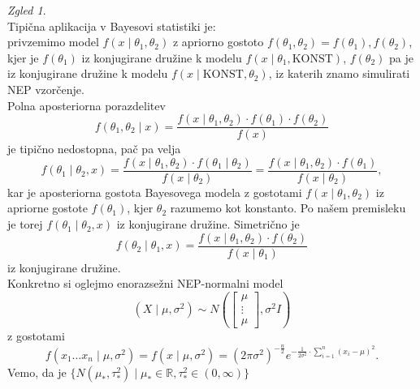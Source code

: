 \documentclass[a4paper, 12pt]{book}
\theoremstyle{definition}
\theoremstyle{remark}
\newtheorem*{exmp}{Zgled}
\newcommand{\R}{\mathbb{R}}
\begin{document}
\begin{exmp} \text{} \\
  Tipična aplikacija v Bayesovi statistiki je: \\
  privzemimo model $f(x \mid \theta_1, \theta_2)$ z apriorno gostoto $f(\theta_1, \theta_2) = f(\theta_1), f(\theta_2)$,
  kjer je $f(\theta_1)$ iz konjugirane družine k modelu $f(x \mid \theta_1, \text{KONST})$,
  $f(\theta_2)$ pa je iz konjugirane družine k modelu $f(x \mid \text{KONST}, \theta_2)$,
  iz katerih znamo simulirati NEP vzorčenje. \\
  Polna aposteriorna porazdelitev
  \begin{equation*}
    f(\theta_1, \theta_2 \mid x) = \frac{f(x \mid \theta_1, \theta_2) \cdot f(\theta_1) \cdot f(\theta_2)}{f(x)}
  \end{equation*}
  je tipično nedostopna, pač pa velja
  \begin{equation}
    \label{apost-theta1,2}
    f(\theta_1 \mid \theta_2, x) = \frac{f(x \mid \theta_1, \theta_2) \cdot f(\theta_1 \mid \theta_2)}{f(x \mid \theta_2)}
    = \frac{f(x \mid \theta_1, \theta_2) \cdot f(\theta_1)}{f(x \mid \theta_2)},
  \end{equation}
  kar je aposteriorna gostota Bayesovega modela z gostotami $f(x \mid \theta_1, \theta_2)$ iz apriorne gostote $f(\theta_1)$,
  kjer $\theta_2$ razumemo kot konstanto.
  Po našem premisleku je torej $f(\theta_1 \mid \theta_2, x)$ iz  konjugirane družine.
  Simetrično je
  \begin{equation*}
    f(\theta_2 \mid \theta_1, x) = \frac{f(x \mid \theta_1, \theta_2) \cdot f(\theta_2)}{f(x \mid \theta_1)}
  \end{equation*}
  iz  konjugirane družine. \\
  Konkretno si oglejmo enorazsežni NEP-normalni model
  \begin{equation}
    \label{NEP-normalni-model}
    (X \mid \mu, \sigma^2) \sim N\left(\begin{bmatrix}\mu \\ \vdots \\ \mu\end{bmatrix}, \sigma^2 I\right)
  \end{equation}
  z gostotami
  \begin{equation*}
    f(x_1 \dots x_n \mid \mu, \sigma^2) = f(x \mid \mu, \sigma^2) =
    \left(2 \pi \sigma^2\right)^{-\frac{n}{2}} e^{-\frac{1}{2 \sigma^2} \cdot \sum_{i=1}^{n} (x_i-\mu)^2}.
  \end{equation*}
  Vemo, da je $\{N(\mu_{*}, \tau_{*}^2) \mid \mu_{*} \in \R, \tau_{*}^2 \in (0, \infty)\}$

\end{exmp}
\end{document}
